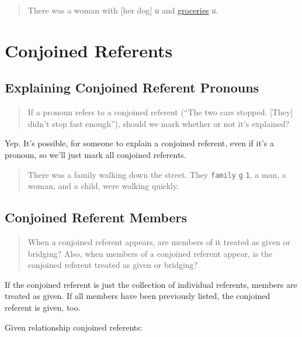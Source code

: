 \documentclass[
]{book}
\begin{document}
\begin{quote}
There was a woman with {[}her dog{]} \texttt{u} and \protect\hyperlink{groceries}{groceries} \texttt{u}.
\end{quote}

\hypertarget{conjoined-referents}{%
\section{Conjoined Referents}\label{conjoined-referents}}

\hypertarget{explaining-conjoined-referent-pronouns}{%
\subsection{Explaining Conjoined Referent Pronouns}\label{explaining-conjoined-referent-pronouns}}

\begin{quote}
If a pronoun refers to a conjoined referent (``The two cars stopped. {[}They{]} didn't stop fast enough''),
should we mark whether or not it's explained?
\end{quote}

Yep.
It's possible, for someone to explain a conjoined referent, even if it's a pronoun, so we'll just mark all conjoined referents.

\begin{quote}
There was a family walking down the street.
They \texttt{family} \texttt{g} \texttt{1}, a man, a woman, and a child, were walking quickly.
\end{quote}

\hypertarget{conjoined-referent-members}{%
\subsection{Conjoined Referent Members}\label{conjoined-referent-members}}

\begin{quote}
When a conjoined referent appears, are members of it treated as given or bridging?
Also, when members of a conjoined referent appear, is the conjoined referent treated as given or bridging?
\end{quote}

If the conjoined referent is just the collection of individual referents, members are treated as given.
If all members have been previously listed, the conjoined referent is given, too.

Given relationship conjoined referents:
\end{document}
